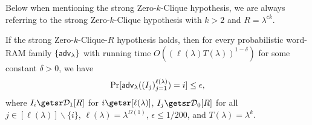  Below when mentioning the strong Zero-$k$-Clique hypothesis, we are always referring to the strong Zero-$k$-Clique hypothesis with $k>2$ and $R = \lambda^{ck}$.


\begin{theorem}
\label{thm:aclh}
If the strong Zero-$k$-Clique-$R$ hypothesis holds, then for every probabilistic word-RAM family $\{{\mathsf{adv}}_\lambda\}$ with running time $O((\ell(\lambda)T(\lambda))^{1-\delta})$ for some constant $\delta>0$, we have
	$$\Pr[{\mathsf{adv}}_\lambda((I_j)_{j=1}^{\ell(\lambda)}) = i] \leq \epsilon,$$
	where $I_i \getsr \zkcdistone{R}$ for $i \getsr [\ell(\lambda)]$, $I_j \getsr \zkcdistzero{R}$ for all $j \in [\ell(\lambda)]\backslash\{i\}$, $\ell(\lambda) = \lambda^{\Omega(1)}$, $\epsilon \leq 1/200$, and $T(\lambda) = \lambda^k$.
\end{theorem}


